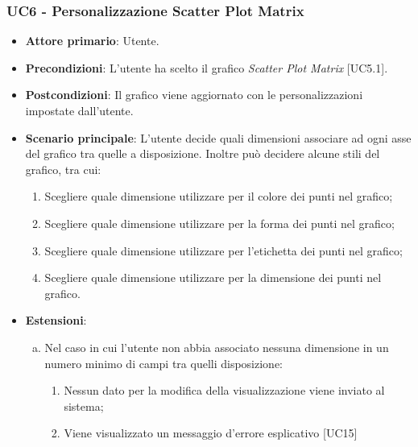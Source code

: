 \subsubsection{UC6 - Personalizzazione Scatter Plot Matrix}
\begin{itemize}
	\item \textbf{Attore primario}: Utente.
	
	\item \textbf{Precondizioni}: L'utente ha scelto il grafico \textit{Scatter Plot Matrix} [UC5.1].
	
	\item \textbf{Postcondizioni}: Il grafico viene aggiornato con le personalizzazioni impostate dall'utente.
	
	\item \textbf{Scenario principale}: L'utente decide quali dimensioni associare ad ogni asse del grafico tra quelle a disposizione. Inoltre può decidere alcune stili del grafico, tra cui:
		\begin{enumerate}
			\item Scegliere quale dimensione utilizzare per il colore dei punti nel grafico;
				
			\item Scegliere quale dimensione utilizzare per la forma dei punti nel grafico;
			
			\item Scegliere quale dimensione utilizzare per l'etichetta dei punti nel grafico;
			
			\item Scegliere quale dimensione utilizzare per la dimensione dei punti nel grafico.
				
		\end{enumerate}
		
	\item \textbf{Estensioni}:
	\begin{enumerate}[(a)]
		\item Nel caso in cui l'utente non abbia associato nessuna dimensione in un numero minimo di campi tra quelli disposizione:
		\begin{enumerate}
			\item Nessun dato per la modifica della visualizzazione viene inviato al sistema;
			\item Viene visualizzato un messaggio d'errore esplicativo [UC15]
		\end{enumerate}
	\end{enumerate}
\end{itemize}


